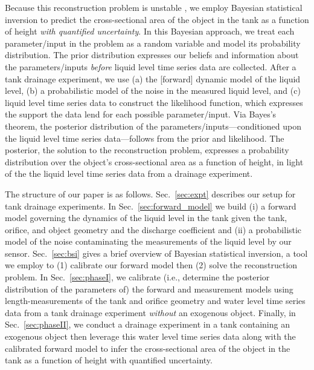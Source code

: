 \documentclass[openacc]{rsproca_new}%
\begin{document}
Because this reconstruction problem is unstable \cite{groetsch1993inverse}, we employ Bayesian statistical inversion \cite{calvetti2018inverse,waqar2023tutorial,kaipio2006statistical,dashti2013bayesian} to predict the cross-sectional area of the object in the tank as a function of height \emph{with quantified uncertainty}.
In this Bayesian approach, we treat each parameter/input in the problem as a random variable and model its probability distribution.
The prior distribution expresses our beliefs and information about the parameters/inputs \emph{before} liquid level time series data are collected.
After a tank drainage experiment, we use (a) the [forward] dynamic model of the liquid level, (b) a probabilistic model of the noise in the measured liquid level, and (c) liquid level time series data to construct the likelihood function, which expresses the support the data lend for each possible parameter/input.
Via Bayes's theorem, the posterior distribution of the parameters/inputs---conditioned upon the liquid level time series data---follows from the prior and likelihood. The posterior, the solution to the reconstruction problem, expresses a probability distribution over the object's cross-sectional area as a function of height, in light of the the liquid level time series data from a drainage experiment.

The structure of our paper is as follows. Sec.~\ref{sec:expt} describes our setup for tank drainage experiments.
In Sec.~\ref{sec:forward_model} we build (i) a forward model governing the dynamics of the liquid level in the tank given the tank, orifice, and object geometry and the discharge coefficient and (ii) a probabilistic model of the noise contaminating the measurements of the liquid level by our sensor.
Sec.~\ref{sec:bsi} gives a brief overview of Bayesian statistical inversion, a tool we employ to (1) calibrate our forward model then (2) solve the reconstruction problem.
In Sec.~\ref{sec:phaseI}, we calibrate (i.e., determine the posterior distribution of the parameters of) the forward and measurement models using length-measurements of the tank and orifice geometry and water level time series data from a tank drainage experiment \emph{without} an exogenous object. 
Finally, in Sec.~\ref{sec:phaseII}, we conduct a drainage experiment in a tank containing an exogenous object then leverage this water level time series data along with the calibrated forward model to infer the cross-sectional area of the object in the tank as a function of height with quantified uncertainty.
\end{document}
